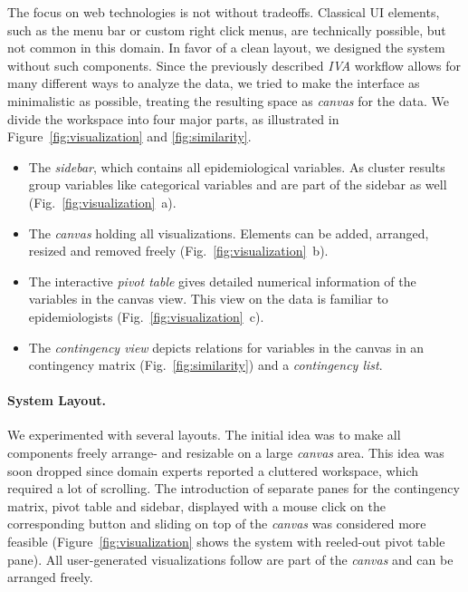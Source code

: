 \documentclass[journal]{style/vgtc} 			          %
\begin{document}
The focus on web technologies is not without tradeoffs.
%
Classical UI elements, such as the menu bar or custom right click menus, are technically possible, but not common in this domain.
%
In favor of a clean layout, we designed the system without such components.
%
Since the previously described \emph{IVA} workflow allows for many different ways to analyze the data, we tried to make the interface as minimalistic as possible, treating the resulting space as \emph{canvas} for the data.
%
We divide the workspace into four major parts, as illustrated in Figure~\ref{fig:visualization} and \ref{fig:similarity}.
\begin{itemize} \itemsep0.2em
		\item The \emph{sidebar}, which contains all epidemiological variables. As cluster results group variables like categorical variables and are part of the sidebar as well (Fig.~\ref{fig:visualization}~a).
	\item The \emph{canvas} holding all visualizations. Elements can be added, arranged, resized and removed freely (Fig.~\ref{fig:visualization}~b).
	\item The interactive \emph{pivot table} gives detailed numerical information of the variables in the canvas view. This view on the data is familiar to epidemiologists (Fig.~\ref{fig:visualization}~c).
	\item The \emph{contingency view} depicts relations for variables in the canvas in an contingency matrix (Fig.~\ref{fig:similarity}) and a \emph{contingency list}.
\end{itemize}

\paragraph{System Layout.}
We experimented with several layouts.
%
The initial idea was to make all components freely arrange- and resizable on a large \emph{canvas} area.
%
This idea was soon dropped since domain experts reported a cluttered workspace, which required a lot of scrolling.
%
The introduction of separate panes for the contingency matrix, pivot table and sidebar, displayed with a mouse click on the corresponding button and sliding on top of the \emph{canvas} was considered more feasible (Figure~\ref{fig:visualization} shows the system with reeled-out pivot table pane).
%
All user-generated visualizations follow are part of the \emph{canvas} and can be arranged freely.
\end{document}
